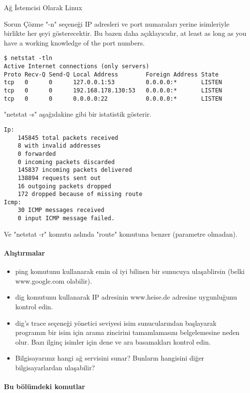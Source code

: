 \begin{section}{Ağ İstemcisi Olarak Linux}
\begin{subsection}{Sorun Çözme}
"-n" seçeneği IP adresleri ve port numaraları yerine isimleriyle birlikte her şeyi gösterecektir. Bu bazen daha açıklayıcıdır, at least as long as you have a working knowledge of the port numbers.

\begin{verbatim}
$ netstat -tln
Active Internet connections (only servers)
Proto Recv-Q Send-Q Local Address        Foreign Address State
tcp   0      0      127.0.0.1:53         0.0.0.0:*       LISTEN
tcp   0      0      192.168.178.130:53   0.0.0.0:*       LISTEN
tcp   0      0      0.0.0.0:22           0.0.0.0:*       LISTEN
\end{verbatim}

"netstat -s" aşağıdakine gibi bir istatistik gösterir.

\begin{verbatim}
Ip:
    145845 total packets received
    8 with invalid addresses
    0 forwarded
    0 incoming packets discarded
    145837 incoming packets delivered
    138894 requests sent out
    16 outgoing packets dropped
    172 dropped because of missing route
Icmp:
    30 ICMP messages received
    0 input ICMP message failed.
\end{verbatim}

Ve "netstat -r" komutu aslında "route" komutuna benzer (parametre olmadan).

\paragraph{Alıştırmalar}{
\begin{itemize}
 \item ping komutunu kullanarak emin ol iyi bilinen bir sunucuya ulaşablirsin (belki www.google.com olabilir).
 \item dig komutunu kullanarak IP adresinin www.heise.de adresine uygunluğunu kontrol edin.
 \item dig's trace seçeneği yönetici seviyesi isim sunucularından başlayarak programın bir isim için arama zincirini tamamlamasını belgelemesine neden olur. Bazı ilginç isimler için dene ve ara basamakları kontrol edin.
 \item Bilgisayarınız hangi ağ servisini sunar? Bunların hangisini diğer bilgisayarlardan ulaşabilir?
\end{itemize}}

\paragraph{Bu bölümdeki komutlar}{
}
\end{subsection}
\end{section}
